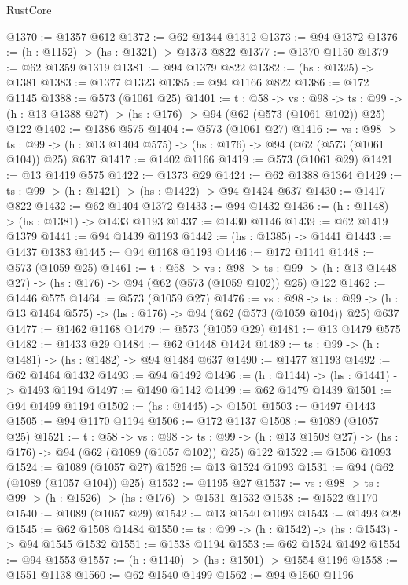 \begin{lexlean}{RustCore}
\begin{coremodule}
@1370 := @1357 @612
@1372 := @62 @1344 @1312
@1373 := @94 @1372
@1376 := (h : @1152) -> (hs : @1321) -> @1373 @822
@1377 := @1370 @1150
@1379 := @62 @1359 @1319
@1381 := @94 @1379 @822
@1382 := (hs : @1325) -> @1381
@1383 := @1377 @1323
@1385 := @94 @1166 @822
@1386 := @172 @1145
@1388 := @573 (@1061 @25)
@1401 := {t : @58} ->
  {vs : @98} ->
  {ts : @99} -> (h : @13 @1388 @27) -> (hs : @176) -> @94 (@62 (@573 (@1061 @102)) @25) @122
@1402 := @1386 @575
@1404 := @573 (@1061 @27)
@1416 := {vs : @98} ->
  {ts : @99} -> (h : @13 @1404 @575) -> (hs : @176) -> @94 (@62 (@573 (@1061 @104)) @25) @637
@1417 := @1402 @1166
@1419 := @573 (@1061 @29)
@1421 := @13 @1419 @575
@1422 := @1373 @29
@1424 := @62 @1388 @1364
@1429 := {ts : @99} -> (h : @1421) -> (hs : @1422) -> @94 @1424 @637
@1430 := @1417 @822
@1432 := @62 @1404 @1372
@1433 := @94 @1432
@1436 := (h : @1148) -> (hs : @1381) -> @1433 @1193
@1437 := @1430 @1146
@1439 := @62 @1419 @1379
@1441 := @94 @1439 @1193
@1442 := (hs : @1385) -> @1441
@1443 := @1437 @1383
@1445 := @94 @1168 @1193
@1446 := @172 @1141
@1448 := @573 (@1059 @25)
@1461 := {t : @58} ->
  {vs : @98} ->
  {ts : @99} -> (h : @13 @1448 @27) -> (hs : @176) -> @94 (@62 (@573 (@1059 @102)) @25) @122
@1462 := @1446 @575
@1464 := @573 (@1059 @27)
@1476 := {vs : @98} ->
  {ts : @99} -> (h : @13 @1464 @575) -> (hs : @176) -> @94 (@62 (@573 (@1059 @104)) @25) @637
@1477 := @1462 @1168
@1479 := @573 (@1059 @29)
@1481 := @13 @1479 @575
@1482 := @1433 @29
@1484 := @62 @1448 @1424
@1489 := {ts : @99} -> (h : @1481) -> (hs : @1482) -> @94 @1484 @637
@1490 := @1477 @1193
@1492 := @62 @1464 @1432
@1493 := @94 @1492
@1496 := (h : @1144) -> (hs : @1441) -> @1493 @1194
@1497 := @1490 @1142
@1499 := @62 @1479 @1439
@1501 := @94 @1499 @1194
@1502 := (hs : @1445) -> @1501
@1503 := @1497 @1443
@1505 := @94 @1170 @1194
@1506 := @172 @1137
@1508 := @1089 (@1057 @25)
@1521 := {t : @58} ->
  {vs : @98} ->
  {ts : @99} -> (h : @13 @1508 @27) -> (hs : @176) -> @94 (@62 (@1089 (@1057 @102)) @25) @122
@1522 := @1506 @1093
@1524 := @1089 (@1057 @27)
@1526 := @13 @1524 @1093
@1531 := @94 (@62 (@1089 (@1057 @104)) @25)
@1532 := @1195 @27
@1537 := {vs : @98} -> {ts : @99} -> (h : @1526) -> (hs : @176) -> @1531 @1532
@1538 := @1522 @1170
@1540 := @1089 (@1057 @29)
@1542 := @13 @1540 @1093
@1543 := @1493 @29
@1545 := @62 @1508 @1484
@1550 := {ts : @99} -> (h : @1542) -> (hs : @1543) -> @94 @1545 @1532
@1551 := @1538 @1194
@1553 := @62 @1524 @1492
@1554 := @94 @1553
@1557 := (h : @1140) -> (hs : @1501) -> @1554 @1196
@1558 := @1551 @1138
@1560 := @62 @1540 @1499
@1562 := @94 @1560 @1196

\end{coremodule}
\end{lexlean}
